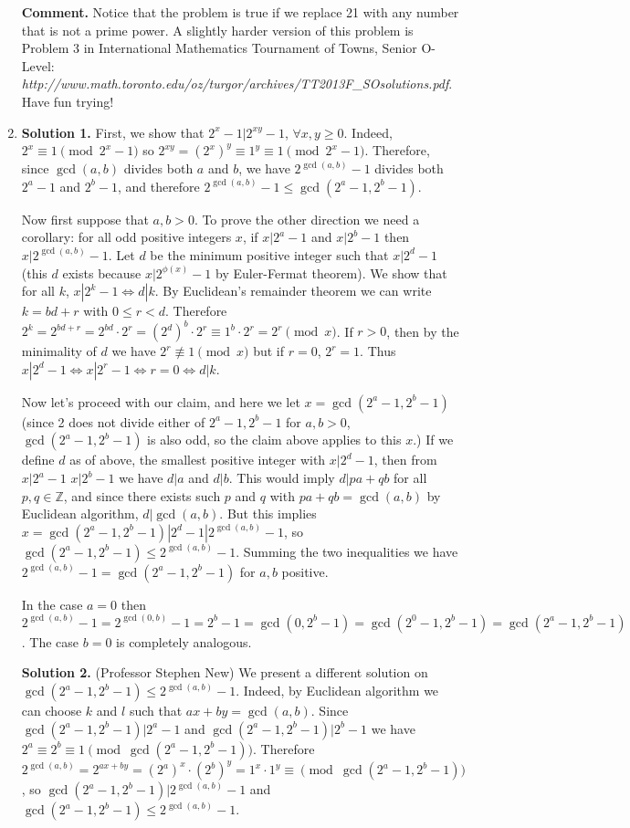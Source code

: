 \documentclass[11pt]{article}
\begin{document}
\begin{enumerate}
\textbf {Comment.} Notice that the problem is true if we replace 21 with any number that is not a prime power. A slightly harder version of this problem is Problem 3 in International Mathematics Tournament of Towns, Senior O-Level:\\ \emph{http://www.math.toronto.edu/oz/turgor/archives/TT2013F\_SOsolutions.pdf}. Have fun trying!

\item\textbf {Solution 1.} First, we show that $2^x-1|2^{xy}-1$, $\forall x, y\ge 0$. Indeed, $2^x\equiv 1\pmod {2^x-1}$ so $2^{xy}=(2^x)^{y}\equiv 1^y\equiv 1\pmod {2^x-1}$. Therefore, since $\gcd (a,b)$ divides both $a$ and $b$, we have $2^{\gcd(a,b)}-1$ divides both $2^a-1$ and $2^b-1$, and therefore $2^{\gcd (a,b)}-1\le \gcd (2^a-1, 2^b-1)$.

Now first suppose that $a,b>0$. To prove the other direction we need a corollary: for all odd positive integers $x$, if $x|2^a-1$ and $x|2^b-1$ then $x|2^{\gcd (a,b)}-1$. Let $d$ be the minimum positive integer such that $x|2^d-1$ (this $d$ exists because $x|2^{\phi (x)}-1$ by Euler-Fermat theorem). We show that for all $k$, $x|2^k-1\Leftrightarrow d|k$. By Euclidean's remainder theorem we can write $k=bd+r$ with $0\le r<d$. Therefore $2^k=2^{bd+r} = 2^{bd}\cdot 2^r = (2^d)^b\cdot 2^r \equiv 1^b\cdot 2^r=2^r\pmod {x}$. If $r>0$, then by the minimality of $d$ we have $2^r\not\equiv 1\pmod {x}$ but if $r=0$, $2^r=1$. Thus $x|2^d-1\Leftrightarrow x|2^r-1\Leftrightarrow r=0\Leftrightarrow d|k$.

Now let's proceed with our claim, and here we let $x=\gcd (2^a-1, 2^b-1)$ (since 2 does not divide either of $2^a-1, 2^b-1$ for $a,b>0$, $\gcd (2^a-1, 2^b-1)$ is also odd, so the claim above applies to this $x$.) If we define $d$ as of above, the smallest positive integer with $x|2^d-1$, then from $x|2^a-1$ $x|2^b-1$ we have $d|a$ and $d|b$. This would imply $d|pa+qb$ for all $p,q\in\mathbb{Z}$, and since there exists such $p$ and $q$ with $pa+qb=\gcd (a,b)$ by Euclidean algorithm, $d|\gcd (a,b)$. But this implies $x=\gcd (2^a-1, 2^b-1)|2^d-1|2^{\gcd (a,b)}-1$, so $\gcd (2^a-1, 2^b-1)\le 2^{\gcd (a,b)}-1$. Summing the two inequalities we have $2^{\gcd (a,b)}-1= \gcd (2^a-1, 2^b-1)$ for $a,b$ positive.

In the case $a=0$ then $2^{\gcd (a,b)}-1=2^{\gcd (0,b)}-1=2^b-1=\gcd (0, 2^b-1)=\gcd (2^0-1, 2^b-1)=\gcd (2^a-1, 2^b-1)$. The case $b=0$ is completely analogous.

\textbf {Solution 2.} (Professor Stephen New) We present a different solution on $\gcd (2^a-1, 2^b-1)\le 2^{\gcd (a,b)}-1$. Indeed, by Euclidean algorithm we can choose $k$ and $l$ such that $ax+by=\gcd (a,b)$. Since $\gcd (2^a-1, 2^b-1)|2^a-1$ and $\gcd (2^a-1, 2^b-1)|2^b-1$ we have $2^a\equiv 2^b\equiv 1\pmod {\gcd (2^a-1, 2^b-1)}$. Therefore $2^{\gcd (a,b)}=2^{ax+by}=(2^a)^x\cdot (2^b)^y=1^x\cdot 1^y\equiv\pmod {\gcd (2^a-1, 2^b-1)}$, so $\gcd (2^a-1, 2^b-1)|2^{\gcd (a,b)}-1$ and $\gcd (2^a-1, 2^b-1)\le 2^{\gcd (a,b)}-1$.

\end{enumerate}
\end{document}
